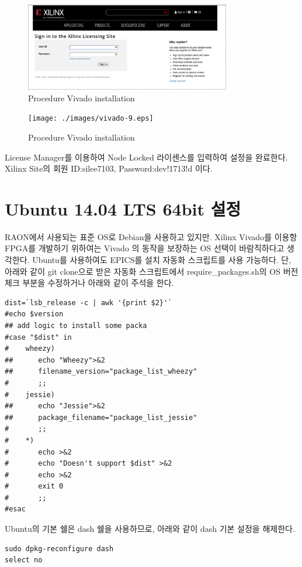 \documentclass[11pt
  , a4paper
  , article
  , oneside
]{memoir}
\begin{document}
\begin{figure}[h!]
	\centering
	\includegraphics[width=0.8\textwidth, height=0.4\textwidth]{./images/vivado-8.eps}
	\caption{Procedure Vivado installation}
	\label{fig:viva_install_8} 
\end{figure}

\begin{figure}[h!]
	\centering
	\texttt{[image: ./images/vivado-9.eps]}
	\caption{Procedure Vivado installation}
	\label{fig:viva_install_9} 
\end{figure}

\clearpage

License Manager를 이용하여 Node Locked 라이센스를 입력하여 설정을 완료한다. Xilinx Site의 회원 ID:silee7103, Password:dev!1713!d 이다.

\chapter{Ubuntu 14.04 LTS 64bit 설정}
RAON에서 사용되는 표준 OS로 Debian을 사용하고 있지만. Xilinx Vivado를 이용항 FPGA를 개발하기 위하여는 Vivado 의 동작을 보장하는 OS 선택이 바람직하다고 생각한다. Ubuntu를 사용하여도 EPICS를 설치 자동화 스크립트를 사용 가능하다.
단, 아래와 같이 git clone으로 받은 자동화 스크립트에서 require\_packages.sh의 OS 버전체크 부분을 수정하거나 아래와 같이 주석을 한다.


\begin{lstlisting}[style=termstyle]
dist=`lsb_release -c | awk '{print $2}'`
#echo $version
## add logic to install some packa
#case "$dist" in
#    wheezy)
##      echo "Wheezy">&2
##      filename_version="package_list_wheezy"
#       ;;
#    jessie)
##      echo "Jessie">&2
##      package_filename="package_list_jessie"
#       ;;
#    *)
#       echo >&2
#       echo "Doesn't support $dist" >&2
#       echo >&2
#       exit 0
#       ;;
#esac
\end{lstlisting}

Ubuntu의 기본 쉘은 dash 쉘을 사용하므로, 아래와 같이 dash 기본 설정을 해제한다.
\begin{lstlisting}[style=termstyle]
sudo dpkg-reconfigure dash
select no
\end{lstlisting}
\end{document}
